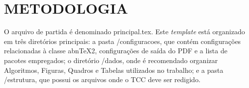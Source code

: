 
\chapter{METODOLOGIA}
\label{chap:metodologia}

O arquivo de partida é denominado {\ttfamily principal.tex}. Este \emph{template} está organizado em três diretórios principais: a pasta {\ttfamily /configuracoes}, que contém configurações relacionadas à classe abn\TeX{}2, configurações de saída do PDF e a lista de pacotes empregados; o diretório {\ttfamily /dados}, onde é recomendado organizar Algoritmos, Figuras, Quadros e Tabelas utilizados no trabalho; e a pasta {\ttfamily /estrutura}, que possui os arquivos onde o TCC deve ser redigido.